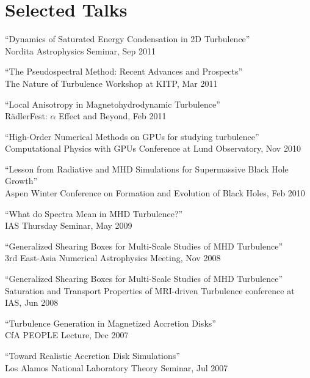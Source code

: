 \section*{Selected Talks}

\begin{ilist}

\item ``Dynamics of Saturated Energy Condensation in 2D Turbulence''\\
  Nordita Astrophysics Seminar, Sep 2011

\item ``The Pseudospectral Method: Recent Advances and Prospects''\\
  The Nature of Turbulence Workshop at KITP, Mar 2011

\item ``Local Anisotropy in Magnetohydrodynamic Turbulence''\\
  R\"adlerFest: $\alpha$ Effect and Beyond, Feb 2011

\item ``High-Order Numerical Methods on GPUs for studying turbulence''\\
  Computational Physics with GPUs Conference at Lund Observatory, Nov 2010

\item ``Lesson from Radiative and MHD Simulations for Supermassive Black Hole Growth''\\
  Aspen Winter Conference on Formation and Evolution of Black Holes, Feb 2010

\item ``What do Spectra Mean in MHD Turbulence?''\\
  IAS Thursday Seminar, May 2009

\item ``Generalized Shearing Boxes for Multi-Scale Studies of MHD Turbulence''\\
  3rd East-Asia Numerical Astrophysics Meeting, Nov 2008

\item ``Generalized Shearing Boxes for Multi-Scale Studies of MHD Turbulence''\\
  Saturation and Transport Properties of MRI-driven Turbulence conference at IAS, Jun 2008

\item ``Turbulence Generation in Magnetized Accretion Disks''\\
  CfA PEOPLE Lecture, Dec 2007

\item ``Toward Realistic Accretion Disk Simulations''\\
  Los Alamos National Laboratory Theory Seminar, Jul 2007

\end{ilist}
